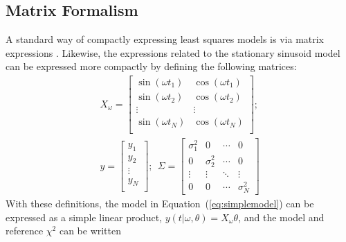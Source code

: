 \documentclass{emulateapj}
\newcommand{\Eq}[1]{Equation~(\ref{eq:#1})}
\newcommand{\eq}[1]{\Eq{#1}}
\newcommand{\sectlabel}[1]{\label{sect:#1}}
\newcommand{\new}[1]{{\color{red} #1}}
\begin{document}
\subsection{Matrix Formalism}
\sectlabel{matrix_formalism}
\new{A standard way of compactly expressing least squares models is via matrix expressions \citep[See e.g.][]{Brandt1970}. Likewise,}
the expressions related to the stationary sinusoid model can be expressed more compactly by defining the following matrices:
\begin{eqnarray}
X_\omega = \left[
\begin{array}{cc}
\sin(\omega t_1) & \cos(\omega t_1)\\
\sin(\omega t_2) & \cos(\omega t_2)\\
\vdots & \vdots \\
\sin(\omega t_N) & \cos(\omega t_N)\\
\end{array}
\right]; \nonumber\\
y = \left[
\begin{array}{c}
y_1 \\
y_2\\
\vdots \\
y_N\\
\end{array}
\right];~~
\Sigma = \left[
\begin{array}{cccc}
\sigma_1^2 & 0 &  \cdots & 0\\
0 & \sigma_2^2 &  \cdots & 0\\
\vdots & \vdots &  \ddots & \vdots\\
0 & 0 &  \cdots & \sigma_N^2
\end{array}
\right]
\end{eqnarray}
With these definitions, the model in \eq{simplemodel} can be expressed as a simple linear product, $y(t|\omega,\theta) = X_\omega\theta$, and the model and reference $\chi^2$ can be written
\end{document}
